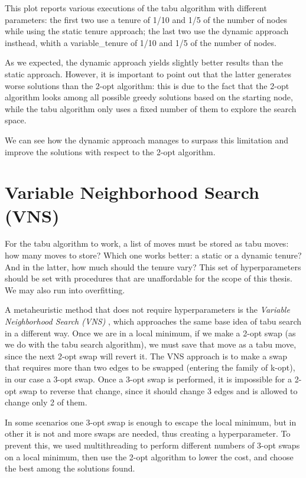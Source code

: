 This plot reports various executions of the tabu algorithm with different parameters: the first two use a tenure of 1/10 and 1/5 of the number of nodes while using the static tenure approach; the last two use the dynamic approach insthead, whith a variable\_tenure of 1/10 and 1/5 of the number of nodes.

As we expected, the dynamic approach yields slightly better results than the static approach. However, it is important to point out that the latter generates worse solutions than the 2-opt algorithm: this is due to the fact that the 2-opt algorithm looks among all possible greedy solutions based on the starting node, while the tabu algorithm only uses a fixed number of them to explore the search space.

We can see how the dynamic approach manages to surpass this limitation and improve the solutions with respect to the 2-opt algorithm.

\section{Variable Neighborhood Search (VNS)}

For the tabu algorithm to work, a list of moves must be stored as tabu moves: how many moves to store? Which one works better: a static or a dynamic tenure? And in the latter, how much should the tenure vary? This set of hyperparameters should be set with procedures that are unaffordable for the scope of this thesis. We may also run into overfitting.

A metaheuristic method that does not require hyperparameters is the \textit{Variable Neighborhood Search (VNS)} \cite{Hansen2019}, which approaches the same base idea of tabu search in a different way. Once we are in a local minimum, if we make a 2-opt swap (as we do with the tabu search algorithm), we must save that move as a tabu move, since the next 2-opt swap will revert it. The VNS approach is to make a swap that requires more than two edges to be swapped (entering the family of k-opt), in our case a 3-opt swap. Once a 3-opt swap is performed, it is impossible for a 2-opt swap to reverse that change, since it should change 3 edges and is allowed to change only 2 of them.

In some scenarios one 3-opt swap is enough to escape the local minimum, but in other it is not and more swaps are needed, thus creating a hyperparameter. To prevent this, we used multithreading to perform different numbers of 3-opt swaps on a local minimum, then use the 2-opt algorithm to lower the cost, and choose the best among the solutions found.

